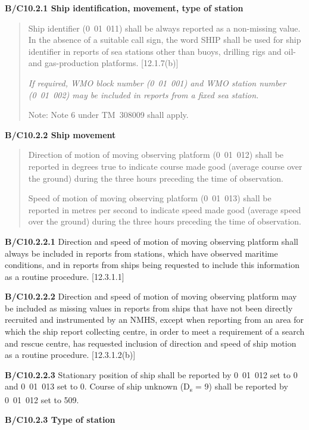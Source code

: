 \textbf{B/C10.2.1 Ship identification, movement, type of station}

\begin{quote}
Ship identifier (0~01~011) shall be always reported as a non-missing value. In the absence of a suitable call sign, the word SHIP shall be used for ship identifier in reports of sea stations other than buoys, drilling rigs and oil- and gas-production platforms. {[}12.1.7(b){]}

\emph{If required, WMO block number (0}~\emph{01~001) and WMO station number (0}~\emph{01~002) may be included in reports from a fixed sea station.}

Note: Note 6 under TM~308009 shall apply.
\end{quote}

\textbf{B/C10.2.2 Ship movement}

\begin{quote}
Direction of motion of moving observing platform (0~01~012) shall be reported in degrees true to indicate course made good (average course over the ground) during the three hours preceding the time of observation.

Speed of motion of moving observing platform (0~01~013) shall be reported in metres per second to indicate speed made good (average speed over the ground) during the three hours preceding the time of observation.
\end{quote}

\textbf{B/C10.2.2.1} Direction and speed of motion of moving observing platform shall always be included in reports from stations, which have observed maritime conditions, and in reports from ships being requested to include this information as a routine procedure. {[}12.3.1.1{]}

\textbf{B/C10.2.2.2} Direction and speed of motion of moving observing platform may be included as missing values in reports from ships that have not been directly recruited and instrumented by an NMHS, except when reporting from an area for which the ship report collecting centre, in order to meet a requirement of a search and rescue centre, has requested inclusion of direction and speed of ship motion as a routine procedure. {[}12.3.1.2(b){]}

\textbf{B/C10.2.2.3} Stationary position of ship shall be reported by 0~01~012 set to 0 and 0~01~013 set to 0. Course of ship unknown (D\textsubscript{s} = 9) shall be reported by 0~01~012 set to 509.

\textbf{B/C10.2.3 Type of station}

